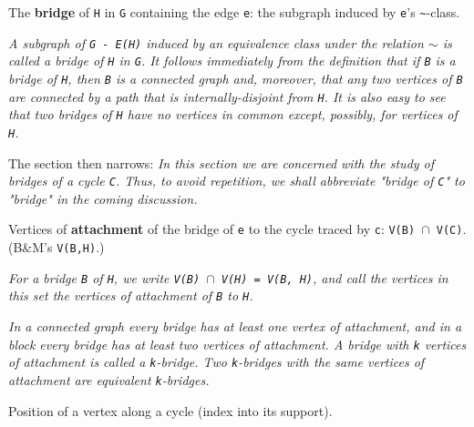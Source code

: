 \begin{definition}
\label{SimpleGraph.bridgeOf}
\leanok
{}
The \textbf{bridge} of \texttt{H} in \texttt{G} containing the edge \texttt{e}: the
subgraph induced by \texttt{e}'s \texttt{\textasciitilde{}}-class.

\emph{A subgraph of \texttt{G - E(H)} induced by an
equivalence class under the relation \texttt{$\sim$} is called a bridge of \texttt{H} in
\texttt{G}. It
follows immediately from the definition that if \texttt{B} is a bridge of \texttt{H},
then \texttt{B} is
a connected graph and, moreover, that any two vertices of \texttt{B} are connected by a
path that is internally-disjoint from \texttt{H}. It is also easy to see that two
bridges
of \texttt{H} have no vertices in common except, possibly, for vertices of \texttt{H}.}

The section then narrows: \emph{In this section we are concerned with the study of
bridges of a cycle \texttt{C}. Thus, to avoid repetition, we shall abbreviate "bridge of
\texttt{C}" to "bridge" in the coming discussion.}
\end{definition}

\begin{definition}
\label{SimpleGraph.attach}
\leanok
{}
Vertices of \textbf{attachment} of the bridge of \texttt{e} to the cycle traced by
\texttt{c}: \texttt{V(B) $\cap$ V(C)}. (B\&M's \texttt{V(B,H)}.)

\emph{For a bridge \texttt{B} of \texttt{H}, we write
\texttt{V(B) $\cap$ V(H) = V(B, H)}, and call the vertices in this set the vertices of
attachment of \texttt{B} to \texttt{H}.}

\emph{In a connected graph every bridge has at least one vertex of attachment, and in a
block every bridge has at least two vertices of attachment.  A bridge with \texttt{k}
vertices of attachment is called a \texttt{k}-bridge. Two \texttt{k}-bridges with the
same
vertices of attachment are equivalent \texttt{k}-bridges.}
\end{definition}

\begin{definition}
\label{SimpleGraph.Walk.cycleIdx}
\leanok
Position of a vertex along a cycle (index into its support).
\end{definition}

